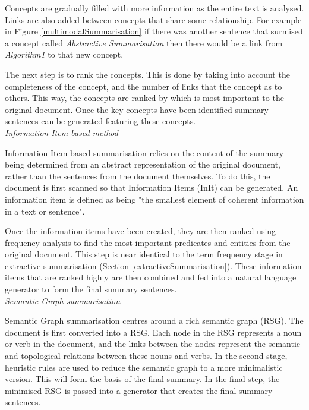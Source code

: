 \documentclass[12pt]{article}
\begin{document}
Concepts are gradually filled with more information as the entire text is analysed. Links are also added between concepts that share some relationship. For example in Figure \ref{multimodalSummarisation} if there was another sentence that surmised a concept called \emph{Abstractive Summarisation} then there would be a link from \emph{Algorithm1} to that new concept. 

The next step is to rank the concepts. This is done by taking into account the completeness of the concept, and the number of links that the concept as to others. This way, the concepts are ranked by which is most important to the original document. Once the key concepts have been identified summary sentences can be generated featuring these concepts. \\

\emph{Information Item based method}

Information Item based summarisation \cite{informationBasedSummarisation} relies on the content of the summary being determined from an abstract representation of the original document, rather than the sentences from the document themselves. To do this, the document is first scanned so that Information Items (InIt) can be generated. An information item is defined as being "the smallest element of coherent information in a text or sentence". 

Once the information items have been created, they are then ranked using frequency analysis to find the most important predicates and entities from the original document. This step is near identical to the term frequency stage in extractive summarisation (Section \ref{extractiveSummarisation}). These information items that are ranked highly are then combined and fed into a natural language generator to form the final summary sentences. \\

\emph{Semantic Graph summarisation}

Semantic Graph summarisation centres around a rich semantic graph (RSG). The document is first converted into a RSG. Each node in the RSG represents a noun or verb in the document, and the links between the nodes represent the semantic and topological relations between these nouns and verbs. In the second stage, heuristic rules are used to reduce the semantic graph to a more minimalistic version. This will form the basis of the final summary. In the final step, the minimised RSG is passed into a generator that creates the final summary sentences.
\end{document}
